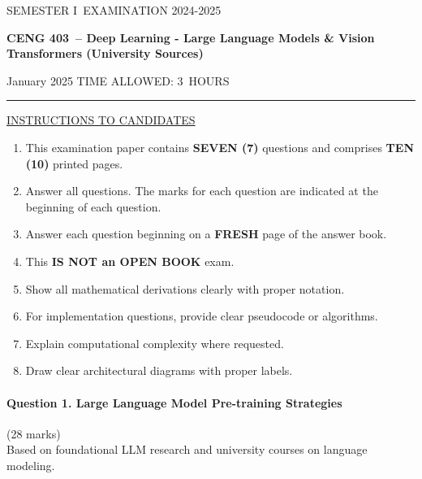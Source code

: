 \documentclass[12pt]{article}
\newcommand{\masunitnumber}{CENG 403}
\newcommand{\examdate}{January 2025}
\newcommand{\academicyear}{2024-2025}
\newcommand{\semester}{I}
\newcommand{\coursename}{Deep Learning - Large Language Models \& Vision Transformers (University Sources)}
\newcommand{\numberofhours}{3}
\begin{document}
\setlength{\headsep}{5truemm}
\setlength{\headheight}{14.5truemm}
\setlength{\voffset}{-0.45truein}
\renewcommand{\headrulewidth}{0.0pt}
\begin{center}
SEMESTER \semester\ EXAMINATION \academicyear
\end{center}
\begin{center}
{\bf \masunitnumber\ -- \coursename}
\end{center}
\vspace{20truemm}
\noindent \examdate\hspace{45truemm} TIME ALLOWED: \numberofhours\ HOURS
\vspace{19truemm}
\hrule
\vspace{19truemm}
\noindent\underline{INSTRUCTIONS TO CANDIDATES}
\vspace{8truemm}
\begin{enumerate}
\item This examination paper contains {\bf SEVEN (7)} questions and comprises 
{\bf TEN (10)} printed pages.
\item Answer all questions. 
The marks for each question are indicated at the beginning of each question.
\item Answer each question beginning on a {\bf FRESH} page of the answer book.
\item This {\bf IS NOT an OPEN BOOK} exam.
\item Show all mathematical derivations clearly with proper notation.
\item For implementation questions, provide clear pseudocode or algorithms.
\item Explain computational complexity where requested.
\item Draw clear architectural diagrams with proper labels.
\end{enumerate}
\newpage
\lhead{}
\rhead{\masunitnumber}
\chead{}
\lfoot{}
\cfoot{\thepage}
\rfoot{}
\setlength{\footskip}{45pt}

\paragraph{Question 1. Large Language Model Pre-training Strategies}\hfill (28 marks)\\
Based on foundational LLM research and university courses on language modeling.
\end{document}
